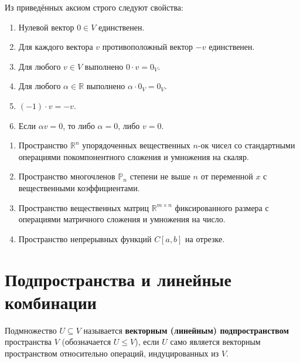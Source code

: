 \begin{proposition}
Из приведённых аксиом строго следуют свойства:
\begin{enumerate}
    \item Нулевой вектор $0 \in V$ единственен.
    \item Для каждого вектора $v$ противоположный вектор $-v$ единственен.
    \item Для любого $v \in V$ выполнено $0 \cdot v = 0_V$.
    \item Для любого $\alpha \in \mathbb{R}$ выполнено $\alpha \cdot 0_V = 0_V$.
    \item $(-1) \cdot v = -v$.
    \item Если $\alpha v = 0$, то либо $\alpha = 0$, либо $v = 0$.
\end{enumerate}
\end{proposition}

\begin{example}
    \begin{enumerate}
        \item Пространство $\mathbb{R}^n$ упорядоченных вещественных $n$-ок чисел со стандартными операциями покомпонентного
        сложения и умножения на скаляр.
        \item Пространство многочленов $\mathbb{P}_n$ степени не выше $n$ от переменной $x$ с вещественными коэффициентами.
        \item Пространство вещественных матриц $\mathbb{R}^{m \times n}$ фиксированного размера с операциями матричного
        сложения и умножения на число.
        \item Пространство непрерывных функций $C[a, b]$ на отрезке.
    \end{enumerate}
\end{example}

\section{Подпространства и линейные комбинации}

\begin{definition}[Subset]
Подмножество $U \subseteq V$ называется \textbf{векторным (линейным) подпространством} пространства $V$ (обозначается $U
\le V$), если $U$ само является векторным пространством относительно операций, индуцированных из $V$.
\end{definition}


